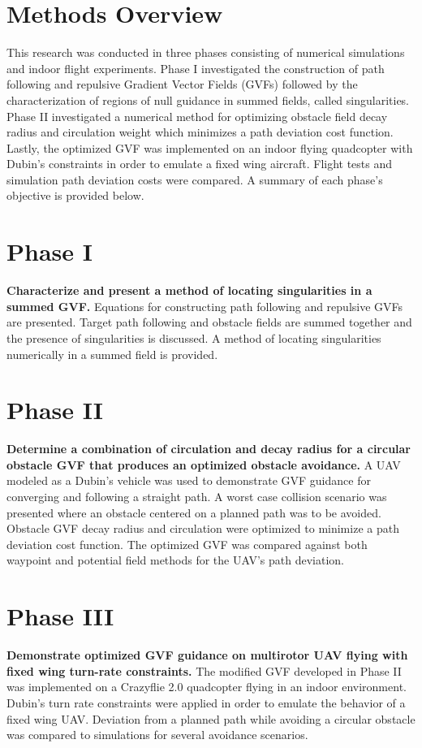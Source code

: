 \documentclass[numbered,pdftex]{ohio-etd}
\begin{document}
 \section{Methods Overview}
 
 This research was conducted in three phases consisting of numerical simulations and indoor flight experiments. Phase I investigated the construction of path following and repulsive Gradient Vector Fields (GVFs) followed by the characterization of regions of null guidance in summed fields, called singularities. Phase II investigated a numerical method for optimizing obstacle field decay radius and circulation weight which minimizes a path deviation cost function. Lastly, the optimized GVF was implemented on an indoor flying quadcopter with Dubin's constraints in order to emulate a fixed wing aircraft. Flight tests and simulation path deviation costs were compared. A summary of each phase's objective is provided below.
 
 

 \section{Phase I}
 \textbf{Characterize and present a method of locating singularities in a summed GVF.}  Equations for constructing path following and repulsive GVFs are presented. Target path following and obstacle fields are summed together and the presence of singularities is discussed. A method of locating singularities numerically in a summed field is provided.
 
 
 
 \section{Phase II}
 \textbf{Determine a combination of circulation and decay radius for a circular obstacle GVF that produces an optimized obstacle avoidance.} A UAV modeled as a Dubin's vehicle was used to demonstrate GVF guidance for converging and following a straight path. A worst case collision scenario was presented where an obstacle centered on a planned path was to be avoided. Obstacle GVF decay radius and circulation were optimized to minimize a path deviation cost function. The optimized GVF was compared against both waypoint and potential field methods for the UAV's path deviation. 
 
 \section{Phase III}
 \textbf{Demonstrate optimized GVF guidance on multirotor UAV flying with fixed wing turn-rate constraints.} The modified GVF developed in Phase II was implemented on a Crazyflie 2.0 quadcopter flying in an indoor environment.  Dubin's turn rate constraints were applied in order to emulate the behavior of a fixed wing UAV. Deviation from a planned path while avoiding a circular obstacle was compared to simulations for several avoidance scenarios.
\end{document}
